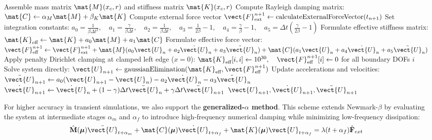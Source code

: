 \begin{algorithm}[htbp]
\caption{Full Order Model (FOM) Implicit Dynamics Solver}
\label{alg:fom_dynamics}
\begin{algorithmic}[1]
    \State Assemble mass matrix $\mat{M}(x_c, r)$ and stiffness matrix $\mat{K}(x_c, r)$
    \State Compute Rayleigh damping matrix: $\mat{C} \gets \alpha_M \mat{M} + \beta_K \mat{K}$
    \State Compute external force vector $\vect{F}_{\text{ext}}^{n+1} \gets \text{calculateExternalForceVector}(t_{n+1})$
    \State Set integration constants:
    \State $a_0 = \frac{1}{\beta \Delta t^2}, \quad a_1 = \frac{\gamma}{\beta \Delta t}, \quad a_2 = \frac{1}{\beta \Delta t}, \quad a_3 = \frac{1}{2\beta} - 1, \quad a_4 = \frac{\gamma}{\beta} - 1, \quad a_5 = \Delta t \left( \frac{\gamma}{2\beta} - 1 \right)$
    \State Formulate effective stiffness matrix:
    \State $\mat{K}_{\text{eff}} \gets \mat{K} + a_0 \mat{M} + a_1 \mat{C}$
    \State Formulate effective force vector:
    \State $\vect{F}_{\text{eff}}^{n+1} \gets \vect{F}_{\text{ext}}^{n+1} + \mat{M}(a_0 \vect{U}_n + a_2 \dot{\vect{U}}_n + a_3 \ddot{\vect{U}}_n) + \mat{C}(a_1 \vect{U}_n + a_4 \dot{\vect{U}}_n + a_5 \ddot{\vect{U}}_n)$
    \State Apply penalty Dirichlet clamping at clamped left edge ($x=0$):
    \State $\mat{K}_{\text{eff}}[i, i] \gets 10^{30}, \quad \vect{F}_{\text{eff}}^{n+1}[i] \gets 0$ for all boundary DOFs $i$
    \State Solve system directly: $\vect{U}_{n+1} \gets \text{gaussianElimination}(\mat{K}_{\text{eff}}, \vect{F}_{\text{eff}}^{n+1})$
    \State Update accelerations and velocities:
    \State $\ddot{\vect{U}}_{n+1} \gets a_0 (\vect{U}_{n+1} - \vect{U}_n) - a_2 \dot{\vect{U}}_n - a_3 \ddot{\vect{U}}_n$
    \State $\dot{\vect{U}}_{n+1} \gets \dot{\vect{U}}_n + (1 - \gamma)\Delta t \ddot{\vect{U}}_n + \gamma \Delta t \ddot{\vect{U}}_{n+1}$
    \State \Return $\vect{U}_{n+1}, \dot{\vect{U}}_{n+1}, \ddot{\vect{U}}_{n+1}$
\EndProcedure
\end{algorithmic}
\end{algorithm}

For higher accuracy in transient simulations, we also support the \textbf{generalized-$\alpha$ method}. This scheme extends Newmark-$\beta$ by evaluating the system at intermediate stages $\alpha_m$ and $\alpha_f$ to introduce high-frequency numerical damping while minimizing low-frequency dissipation:
\begin{equation}
    \hat{\mathbf{M}}(\boldsymbol{\mu}) \ddot{\vect{U}}_{t+\alpha_m} + \mat{C}(\boldsymbol{\mu}) \dot{\vect{U}}_{t+\alpha_f} + \mat{K}(\boldsymbol{\mu}) \vect{U}_{t+\alpha_f} = \lambda(t+\alpha_f) \hat{\mathbf{F}}_{ext}
\end{equation}

